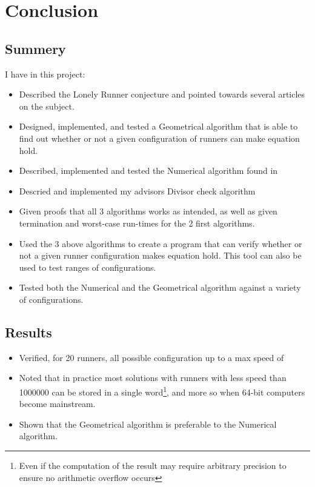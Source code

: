 

\section{Conclusion}
\label{conclusion}

\subsection{Summery}

I have in this project:
\begin{itemize}
\item Described the Lonely Runner conjecture and pointed towards several articles on the subject.
\item Designed, implemented, and tested a Geometrical algorithm that is able to find out whether or not a given configuration of runners can make equation  hold.
\item Described, implemented and tested the Numerical algorithm found in \cite{invis}
\item Descried and implemented my advisors Divisor check algorithm
\item Given proofs that all 3 algorithms works as intended, as well as given termination and  worst-case run-times for the 2 first algorithms.
\item Used the 3 above algorithms to create a program that can verify whether or not a given runner configuration makes equation  hold. This tool can also be used to test ranges of configurations.
\item Tested both the Numerical and the Geometrical algorithm against a variety of configurations.
\end{itemize}

\subsection{Results}
\begin{itemize}
\item Verified, for 20 runners, all possible configuration up to a max speed of \maxNumbers
\item Noted that in practice most solutions with runners with less speed than 1000000 can be stored in a single word\footnote{Even if the computation of the result may require arbitrary precision to ensure no arithmetic overflow occurs}, and more so when 64-bit computers become mainstream.
\item Shown that the Geometrical algorithm is preferable to the Numerical algorithm.
\end{itemize}

